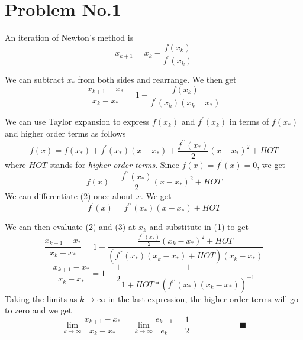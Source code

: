 \section*{Problem No.1} \label{sec:prob1}

An iteration of Newton's method is 
\[
x_{k+1} = x_{k} - \frac{f(x_{k})}{f^{\prime}(x_{k})} 
\]

We can subtract $x_{*}$ from both sides and rearrange. We then get
\begin{equation}
\frac{x_{k+1} -x_{*}}{x_{k} -x_{*}} = 1 - \frac{f(x_{k})}{f^{\prime}(x_{k}) (x_{k}-x_{*})} 
\end{equation}


We can use Taylor expansion to express $f(x_{k})$ and $f^{\prime}(x_{k})$ in terms of $f(x_{*})$ and higher order terms as follows
\[
f(x) = f(x_{*}) + f^{\prime}(x_{*})(x-x_{*}) + \frac{f^{\prime \prime}(x_{*})}{2}(x-x_{*})^{2}+HOT 
\] 
where $HOT$ stands for \emph{higher order terms}. Since $f(x)=f^{\prime}(x)=0$, we get
\begin{equation}
f(x) = \frac{f^{\prime \prime}(x_{*})}{2}(x-x_{*})^{2}+HOT
\end{equation}
We can differentiate (2) once about $x$. We get
\begin{equation}
f^{\prime}(x) = f^{\prime \prime}(x_{*})(x-x_{*})+HOT
\end{equation}

We can then evaluate (2) and (3) at $x_{k}$ and substitute in (1) to get
\[
\frac{x_{k+1} -x_{*}}{x_{k} -x_{*}} = 1 - \frac{  \frac{f^{\prime \prime}(x_{*})}{2}(x_{k}-x_{*})^{2}+HOT }{ (f^{\prime \prime}(x_{*})(x_{k}-x_{*})+HOT) (x_{k}-x_{*})}
\]
\[
\frac{x_{k+1} -x_{*}}{x_{k} -x_{*}} = 1 - \frac{1}{2} \frac{1}{1 + HOT*(f^{\prime \prime}(x_{*})(x_{k}-x_{*}))^{-1}}
\]
Taking the limits as $k\rightarrow \infty$ in the last expression, the higher order terms will go to zero and we get 
$$
\lim_{k \to \infty} \frac{x_{k+1} -x_{*}}{x_{k} -x_{*}} = \lim_{k \to \infty} \frac{e_{k+1}}{e_{k}} = \frac{1}{2} \qquad \qquad \qquad \blacksquare
$$